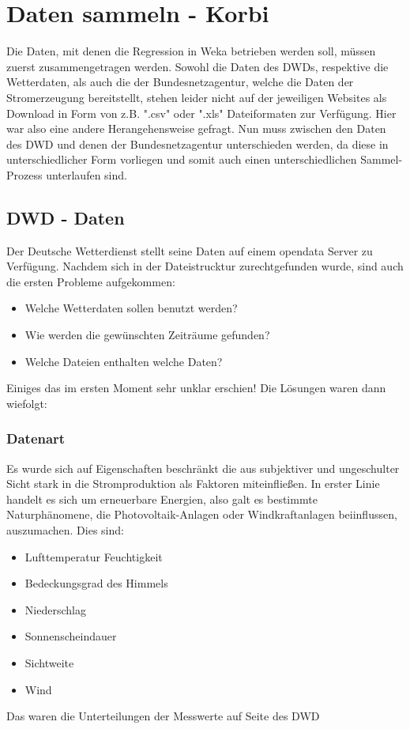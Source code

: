 \documentclass[letterpaper]{article} %
\begin{document}
\section*{Daten sammeln - Korbi}
        Die Daten, mit denen die Regression in Weka betrieben werden soll, müssen zuerst zusammengetragen werden. Sowohl die Daten des DWDs, respektive die Wetterdaten, als auch die der Bundesnetzagentur, welche die Daten der Stromerzeugung bereitstellt, stehen leider nicht auf der jeweiligen Websites als Download in Form von z.B. ".csv" oder ".xls" Dateiformaten zur Verfügung. Hier war also eine andere Herangehensweise gefragt. Nun muss zwischen den Daten des DWD und denen der Bundesnetzagentur unterschieden werden, da diese in unterschiedlicher Form vorliegen und somit auch einen unterschiedlichen Sammel-Prozess unterlaufen sind.

    \subsection*{DWD - Daten}
        Der Deutsche Wetterdienst stellt seine Daten auf einem opendata Server zu Verfügung. Nachdem sich in der Dateistrucktur zurechtgefunden wurde, sind auch die ersten Probleme aufgekommen:
        \begin{itemize}
            \item Welche Wetterdaten sollen benutzt werden?
            \item Wie werden die gewünschten Zeiträume gefunden?
            \item Welche Dateien enthalten welche Daten?
        \end{itemize}
        Einiges das im ersten Moment sehr unklar erschien! Die Lösungen waren dann wiefolgt:
            \subsubsection*{Datenart}
                Es wurde sich auf Eigenschaften beschränkt die aus subjektiver und ungeschulter Sicht stark in die Stromproduktion als Faktoren miteinfließen. In erster Linie handelt es sich um erneuerbare Energien, also galt es bestimmte Naturphänomene, die Photovoltaik-Anlagen oder Windkraftanlagen beiinflussen, auszumachen. Dies sind:
                \begin{itemize}
                    \item Lufttemperatur Feuchtigkeit
                    \item Bedeckungsgrad des Himmels
                    \item Niederschlag
                    \item Sonnenscheindauer
                    \item Sichtweite
                    \item Wind
                \end{itemize}
                Das waren die Unterteilungen der Messwerte auf Seite des DWD
\end{document}
